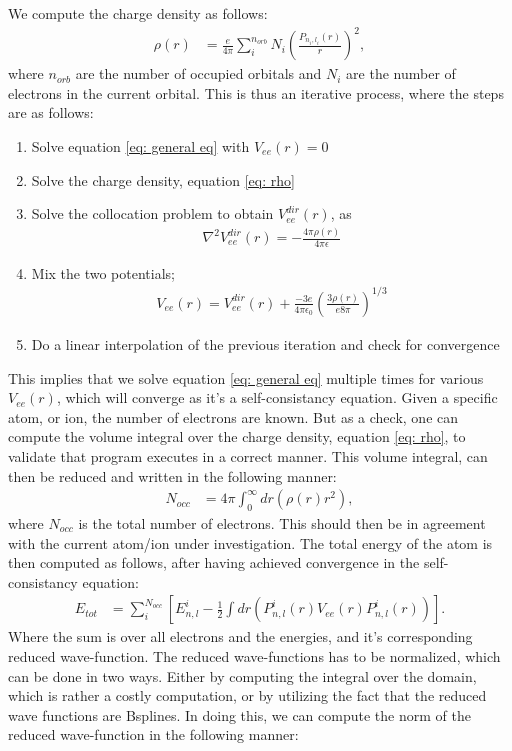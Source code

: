 \documentclass[a4paper]{article}
\newcommand{\laplace}{\nabla^2}
\begin{document}
We compute the charge density as follows:
\begin{align}
    \rho(r) &= \frac{e}{4\pi}\sum_i^{n_{orb}}N_i\left(\frac{P_{n_i,l_i}(r)}{r}\right)^2,\label{eq: rho}
\end{align}where $n_{orb}$ are the number of occupied orbitals and $N_i$ are the number of electrons in the current orbital.
This is thus an iterative process, where the steps are as follows:
\newpage
\begin{enumerate}
    \item Solve equation \eqref{eq: general eq} with $V_{ee}(r) = 0$
    \item Solve the charge density, equation \eqref{eq: rho}
    \item Solve the collocation problem to obtain $V_{ee}^{dir}(r)$, as
    \begin{align}
        \laplace V_{ee}^{dir}(r) = -\frac{4\pi\rho(r)}{4\pi\epsilon}\label{eq: Poission eq}
    \end{align}
    \item Mix the two potentials;
    \begin{align}
        V_{ee}(r) = V_{ee}^{dir}(r) + \frac{-3e}{4\pi\epsilon_0}\left(\frac{3\rho(r)}{e8\pi}\right)^{1/3}\label{eq: vEE}
    \end{align}
    \item Do a linear interpolation of the previous iteration and check for convergence
\end{enumerate}
This implies that we solve equation \eqref{eq: general eq} multiple times for various $V_{ee}(r)$, which will converge as it's a self-consistancy equation.
Given a specific atom, or ion, the number of electrons are known. But as a check, one can compute the volume integral over the charge density, equation \eqref{eq: rho}, to validate that program executes in a correct manner. This volume integral, can then be reduced and written in the following manner:
\begin{align}
    N_{occ} &= 4\pi\int_0^\infty dr\left(\rho(r)r^2\right),
\end{align}where $N_{occ}$ is the total number of electrons. This should then be in agreement with the current atom/ion under investigation. The total energy of the atom is then computed as follows, after having achieved convergence in the self-consistancy equation:
\begin{align}
    E_{tot} &= \sum_i^{N_{occ}}\left[E_{n,l}^i -\frac{1}{2}\int dr\left(P_{n,l}^i(r)V_{ee}(r)P_{n,l}^i(r)\right)\right].
\end{align}Where the sum is over all electrons and the energies, and it's corresponding reduced wave-function. The reduced wave-functions has to be normalized, which can be done in two ways. Either by computing the integral over the domain, which is rather a costly computation, or by utilizing the fact that the reduced wave functions are Bsplines. In doing this, we can compute the norm of the reduced wave-function in the following manner:
\end{document}
